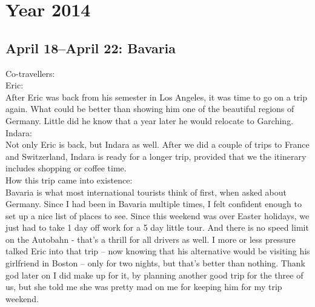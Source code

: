 \chapter{Year 2014}
\label{2014}

\section{April 18--April 22: Bavaria}
\label{2014:Germany}

Co-travellers: \\
Eric:\\
After Eric was back from his semester in Los Angeles, it was time to go on a trip again. What could be better than showing him one of the beautiful regions of Germany. Little did he know that a year later he would relocate to Garching.\\

Indara:\\
Not only Eric is back, but Indara as well. After we did a couple of trips to France and Switzerland, Indara is ready for a longer trip, provided that we the itinerary includes shopping or coffee time.\\

How this trip came into existence:\\
Bavaria is what most international tourists think of first, when asked about Germany. Since I had been in Bavaria multiple times, I felt confident enough to set up a nice list of places to see. Since this weekend was over Easter holidays, we just had to take 1 day off work for a 5 day little tour. And there is no speed limit on the Autobahn - that's a thrill for all drivers as well. I more or less pressure talked Eric into that trip -- now knowing that his alternative would be visiting his girlfriend in Boston -- only for two nights, but that's better than nothing. Thank god later on I did make up for it, by planning another good trip for the three of us, but she told me she was pretty mad on me for keeping him for my trip weekend.\\

